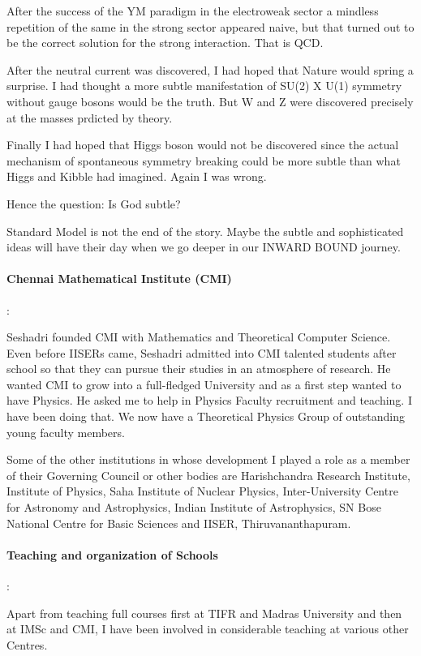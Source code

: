 After the success of the YM paradigm in the electroweak sector a 
mindless repetition of the same in the strong sector appeared naive, but 
that turned out to be the correct solution for the strong interaction. 
That is QCD.

After the neutral current was discovered, I had hoped that Nature would 
spring a surprise. I had thought a more subtle manifestation of SU(2) X 
U(1) symmetry without gauge bosons would be the truth. But W and Z were 
discovered precisely at the masses prdicted by theory.

Finally I had hoped that Higgs boson would not be discovered since the 
actual mechanism of spontaneous symmetry breaking could be more subtle 
than what Higgs and Kibble had imagined. Again I was wrong.

Hence the question: Is God subtle?

Standard Model is not the end of the story. Maybe the subtle and 
sophisticated ideas will have their day when we go deeper in our INWARD 
BOUND journey.

\paragraph{Chennai Mathematical Institute (CMI)}:

Seshadri founded CMI with Mathematics and Theoretical Computer Science. 
Even before IISERs came, Seshadri admitted into CMI talented students 
after school so that they can pursue their studies in an atmosphere of 
research. He wanted CMI to grow into a full-fledged University and as a 
first step wanted to have Physics. He asked me to help in Physics 
Faculty recruitment and teaching. I have been doing that. We now have a 
Theoretical Physics Group of outstanding young faculty members.

Some of the other institutions in whose development I played a role as a 
member of their Governing Council or other bodies are Harishchandra 
Research Institute, Institute of Physics, Saha Institute of Nuclear 
Physics, Inter-University Centre for Astronomy and Astrophysics, Indian 
Institute of Astrophysics, SN Bose National Centre for Basic Sciences 
and IISER, Thiruvananthapuram.

\paragraph{Teaching and organization of Schools}:

Apart from teaching full courses first at TIFR and Madras
University and then at IMSc and CMI, I have been involved in
considerable teaching at various other Centres.

